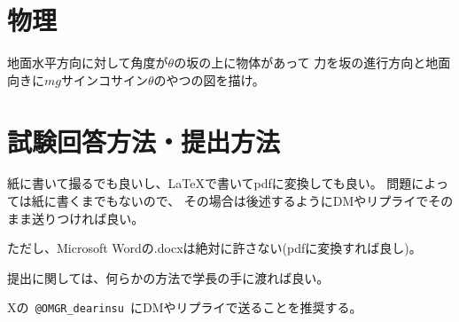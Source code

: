 \documentclass[uplatex]{jsarticle}
\begin{document}
\section{物理}
地面水平方向に対して角度が$\theta$の坂の上に物体があって
力を坂の進行方向と地面向きに$mg$サインコサイン$\theta$のやつの図を描け。

\section*{試験回答方法・提出方法}

紙に書いて撮るでも良いし、\LaTeX で書いてpdfに変換しても良い。
問題によっては紙に書くまでもないので、
その場合は後述するようにDMやリプライでそのまま送りつければ良い。

ただし、Microsoft Wordの.docxは絶対に許さない(pdfに変換すれば良し)。

提出に関しては、何らかの方法で学長の手に渡れば良い。

Xの\texttt{ @OMGR\_dearinsu }にDMやリプライで送ることを推奨する。
\end{document}

